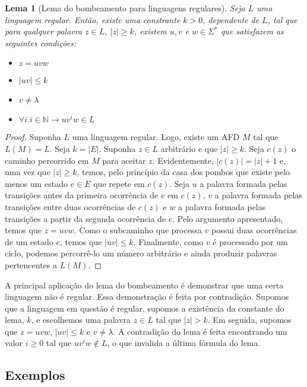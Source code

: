 \documentclass[a4paper]{article}
\newtheorem{Lemma}{Lema}
\theoremstyle{definition}
\begin{document}
  \begin{Lemma}[Lema do bombeamento para linguagens regulares]
    Seja $L$ uma linguagem regular. Então, existe uma constrante $k > 0$,
    dependente de $L$, tal que para qualquer palavra $z \in L$, $|z| \geq k$,
    existem $u,v$ e $w \in \Sigma^*$ que satisfazem as seguintes condições:
    \begin{itemize}
      \item $z = uvw$
      \item $|uv| \leq k$
      \item $v \neq \lambda$
      \item $\forall i. i \in \mathbb{N} \to uv^iw \in L$
    \end{itemize}
  \end{Lemma}
  \begin{proof}
    Suponha $L$ uma linguagem regular. Logo, existe um AFD $M$ tal que $L(M) =
    L$. Seja $k = |E|$. Suponha $z \in L$ arbitrário e que $|z| \geq  k$.
    Seja $c(z)$ o caminho percorrido em $M$ para aceitar $z$. Evidentemente,
    $|c(z)| = |z| + 1$ e, uma vez que $|z| \geq k$, temos, pelo princípio
    da casa dos pombos que existe pelo menos um estado $e \in E$ que repete em
    $c(z)$. Seja $u$ a palavra formada pelas transições antes da primeira
    ocorrência de $e$ em $c(z)$, $v$ a palavra formada pelas transições entre duas
    ocorrências de $c(z)$ e $w$ a palavra formada pelas transições a partir
    da segunda ocorrência de $e$. Pelo argumento apresentado, temos que
    $z = uvw$. Como o subcaminho que processa $v$ possui duas ocorrências de
    um estado $e$, temos que $|uv| \leq k$. Finalmente, como $v$ é processado
    por um ciclo, podemos percorrê-lo um número arbitrário e ainda produzir
    palavras pertencentes a $L(M)$.
  \end{proof}

  A principal aplicação do lema do bombeamento é demonstrar que uma certa
  linguagem não é regular. Essa demonstração é feita por contradição.
  Supomos que a linguagem em questão é regular, supomos a existência
  da constante do lema, $k$, e escolhemos uma palavra $z \in L$ tal que
  $|z| > k$. Em seguida, supomos que $z = uvw$, $|uv| \leq k$ e
  $v \neq \lambda$. A contradição do lema é feita encontrando um valor $i \geq
  0$ tal que $uv^iw \not\in L$, o que invalida a última fórmula do lema.
 
  \subsection{Exemplos}
\end{document}

